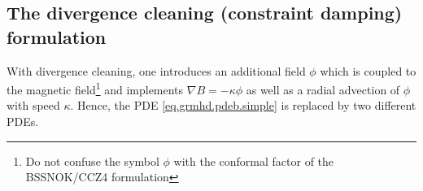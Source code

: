 \documentclass[a4paper]{article}
\begin{document}
%
%

\subsection{The divergence cleaning (constraint damping) formulation}

With divergence cleaning, one introduces an additional field $\phi$
which is coupled to the magnetic field\footnote{Do not confuse the
symbol $\phi$ with the conformal factor of the BSSNOK/CCZ4 formulation}
and implements $\nabla B = - \kappa \phi$ as well as a radial advection
of $\phi$ with speed $\kappa$.
Hence, the PDE \eqref{eq.grmhd.pdeb.simple} is replaced by two
different PDEs.
\end{document}
